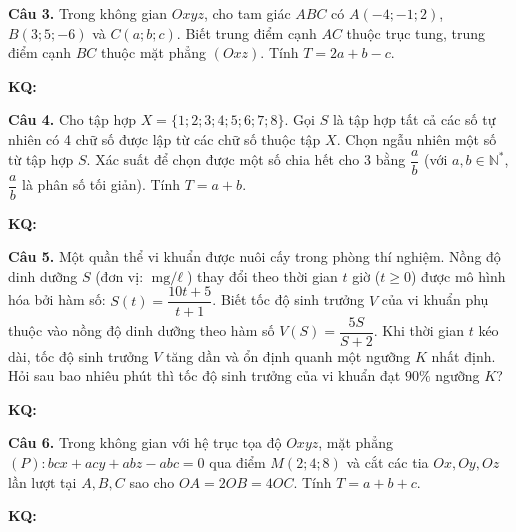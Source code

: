 \documentclass[12pt,a4paper]{article}
\begin{document}
\vspace{0.3cm}
\textbf{Câu 3.} Trong không gian $Oxyz$, cho tam giác $ABC$ có $A(-4; -1; 2)$, $B(3; 5; -6)$ và $C(a; b; c)$. Biết trung điểm cạnh $AC$ thuộc trục tung, trung điểm cạnh $BC$ thuộc mặt phẳng $(Oxz)$. Tính $T = 2a + b - c$.

\vspace{0.1cm}
\noindent\textbf{KQ:} \fbox{\phantom{\rule{2.5cm}{0.5cm}}}

\vspace{0.3cm}
\textbf{Câu 4.} Cho tập hợp $X = \{1; 2; 3; 4; 5; 6; 7; 8\}$. Gọi $S$ là tập hợp tất cả các số tự nhiên có 4 chữ số được lập từ các chữ số thuộc tập $X$. Chọn ngẫu nhiên một số từ tập hợp $S$. Xác suất để chọn được một số chia hết cho 3 bằng $\dfrac{a}{b}$ (với $a, b \in \mathbb{N}^*$, $\dfrac{a}{b}$ là phân số tối giản). Tính $T = a + b$.

\vspace{0.1cm}
\noindent\textbf{KQ:} \fbox{\phantom{\rule{2.5cm}{0.5cm}}}

\vspace{0.3cm}
\textbf{Câu 5.} Một quần thể vi khuẩn được nuôi cấy trong phòng thí nghiệm. Nồng độ dinh dưỡng $S$ (đơn vị: $\text{mg/}\ell$) thay đổi theo thời gian $t$ giờ ($t \geqslant 0$) được mô hình hóa bởi hàm số: $S(t) = \dfrac{10t + 5}{t + 1}$. Biết tốc độ sinh trưởng $V$ của vi khuẩn phụ thuộc vào nồng độ dinh dưỡng theo hàm số $V(S) = \dfrac{5S}{S + 2}$. Khi thời gian $t$ kéo dài, tốc độ sinh trưởng $V$ tăng dần và ổn định quanh một ngưỡng $K$ nhất định. Hỏi sau bao nhiêu phút thì tốc độ sinh trưởng của vi khuẩn đạt $90\%$ ngưỡng $K$?

\vspace{0.1cm}
\noindent\textbf{KQ:} \fbox{\phantom{\rule{2.5cm}{0.5cm}}}

\vspace{0.3cm}
\textbf{Câu 6.} Trong không gian với hệ trục tọa độ $Oxyz$, mặt phẳng $(P)\colon bcx + acy + abz - abc = 0$ qua điểm $M(2; 4; 8)$ và cắt các tia $Ox, Oy, Oz$ lần lượt tại $A, B, C$ sao cho $OA = 2OB = 4OC$. Tính $T = a + b + c$.

\vspace{0.1cm}
\noindent\textbf{KQ:} \fbox{\phantom{\rule{2.5cm}{0.5cm}}}
\end{document}
